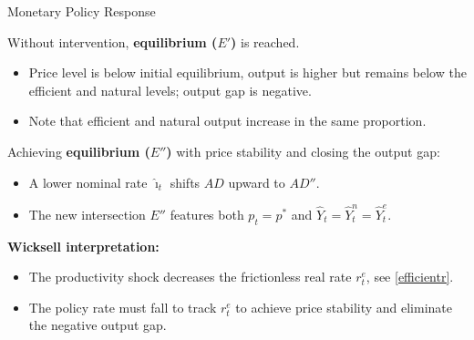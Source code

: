 \documentclass[11pt,aspectratio=169]{beamer}
\begin{document}
\begin{frame}[label=TempProdDynamics]{Monetary Policy Response}
\small

Without intervention, \textbf{equilibrium ($E'$)} is reached.
\begin{itemize}
    \item Price level is below initial equilibrium, output is higher but remains below the efficient and natural levels; output gap is negative.
    \item Note that efficient and natural output increase in the same proportion.
\end{itemize}

Achieving \textbf{equilibrium ($E''$)} with price stability and closing the output gap:
\begin{itemize}
    \item A lower nominal rate $\hat{\imath}_t$ shifts $AD$ upward to $AD''$.
    \item The new intersection $E''$ features both $p_t = p^{\ast}$ and $\hat{Y}_t = \hat{Y}^n_t = \hat{Y}^e_t$.
\end{itemize}

\textbf{Wicksell interpretation:}
\begin{itemize}
    \item The productivity shock decreases the frictionless real rate $r^e_t$, see \eqref{efficientr}.
    \item The policy rate must fall to track $r^e_t$ to achieve price stability and eliminate the negative output gap.
\end{itemize}
\end{frame}
\end{document}
